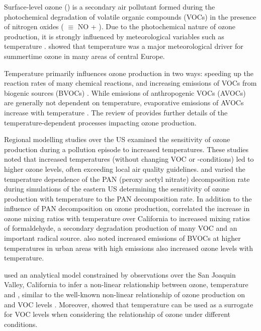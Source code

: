 Surface-level ozone () is a secondary air pollutant formed during the photochemical degradation of volatile organic compounds (VOCs) in the presence of nitrogen oxides ( $\equiv$ NO + ).
Due to the photochemical nature of ozone production, it is strongly influenced by meteorological variables such as temperature \citep{Jacob:2009}.
\citet{Otero:2016} showed that temperature was a major meteorological driver for summertime ozone in many areas of central Europe.

Temperature primarily influences ozone production in two ways: speeding up the reaction rates of many chemical reactions, and increasing emissions of VOCs from biogenic sources (BVOCs) \citep{Sillman:1995a}.
While emissions of anthropogenic VOCs (AVOCs) are generally not dependent on temperature, evaporative emissions of AVOCs increase with temperature \citep{Rubin:2006}.
The review of \citet{Pusede:2015} provides further details of the temperature-dependent processes impacting ozone production.

Regional modelling studies over the US \citep{Sillman:1995a, Steiner:2006, Dawson:2007} examined the sensitivity of ozone production during a pollution episode to increased temperatures.
These studies noted that increased temperatures (without changing VOC or -conditions) led to higher ozone levels, often exceeding local air quality guidelines.
\citet{Sillman:1995a} and \citet{Dawson:2007} varied the temperature dependence of the PAN (peroxy acetyl nitrate) decomposition rate during simulations of the eastern US determining the sensitivity of ozone production with temperature to the PAN decomposition rate.
In addition to the influence of PAN decomposition on ozone production, \citet{Steiner:2006} correlated the increase in ozone mixing ratios with temperature over California to increased mixing ratios of formaldehyde, a secondary degradation production of many VOC and an important radical source.
\citet{Steiner:2006} also noted increased emissions of BVOCs at higher temperatures in urban areas with high  emissions also increased ozone levels with temperature.

\citet{Pusede:2014} used an analytical model constrained by observations over the San Joaquin Valley, California to infer a non-linear relationship between ozone, temperature and , similar to the well-known non-linear relationship of ozone production on  and VOC levels \citep{Sillman:1999}.
Moreover, \citet{Pusede:2014} showed that temperature can be used as a surrogate for VOC levels when considering the relationship of ozone under different  conditions.

